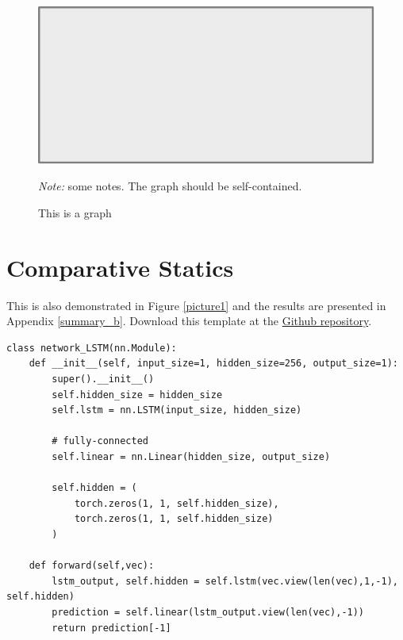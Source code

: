 \documentclass[11pt, letterpaper]{article}
\begin{document}
\begin{figure}[H]
  \centering
  \caption{This is a graph}
  \includegraphics[scale=0.5]{Graph/pic.pdf}
  \hspace*{-0.6cm}
  \begin{minipage}{0.9\textwidth}
    \onehalfspacing
    \vspace*{0.12cm}
    \begin{tablenotes}
      \footnotesize
      \item\textit{Note:} some notes. The graph should be self-contained. \lipsum[65]
    \end{tablenotes}
  \end{minipage}
\end{figure}

\section{Comparative Statics}

This is also demonstrated in Figure \ref{picture1} and the results are presented in Appendix \ref{summary_b}. Download this template at the \href{https://github.com/howardhsumail/Paper-LaTeX-Template.git}{Github repository}. \lipsum[104] 

\begin{lstlisting}[style=python_code, caption={Long short-term memory}, label=mypythoncode]
class network_LSTM(nn.Module):
    def __init__(self, input_size=1, hidden_size=256, output_size=1):
        super().__init__()
        self.hidden_size = hidden_size
        self.lstm = nn.LSTM(input_size, hidden_size)

        # fully-connected
        self.linear = nn.Linear(hidden_size, output_size)

        self.hidden = (
            torch.zeros(1, 1, self.hidden_size),
            torch.zeros(1, 1, self.hidden_size)
        )

    def forward(self,vec):
        lstm_output, self.hidden = self.lstm(vec.view(len(vec),1,-1), self.hidden)
        prediction = self.linear(lstm_output.view(len(vec),-1))
        return prediction[-1]
\end{lstlisting}
\end{document}
